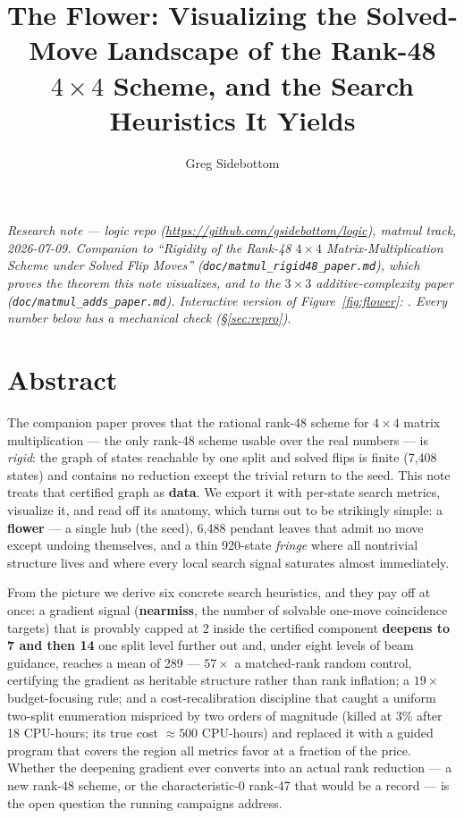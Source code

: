 \documentclass[10pt]{article}
\title{\bfseries The Flower: Visualizing the Solved-Move Landscape of
  the Rank-48 $4\times4$ Scheme, and the Search Heuristics It Yields}
\author{Greg Sidebottom}
\date{}
\begin{document}
\maketitle
\vspace{-3em}
\begin{center}
\itshape Research note --- logic repo
(\url{https://github.com/gsidebottom/logic}), matmul track,
2026-07-09. Companion to ``Rigidity of the Rank-48 $4\times4$
Matrix-Multiplication Scheme under Solved Flip Moves''
(\texttt{doc/matmul\_rigid48\_paper.md}), which proves the theorem
this note visualizes, and to the $3\times3$ additive-complexity paper
(\texttt{doc/matmul\_adds\_paper.md}). Interactive version of
Figure~\ref{fig:flower}:
.
Every number below has a mechanical check (\S\ref{sec:repro}).
\end{center}

\section*{Abstract}

The companion paper proves that the rational rank-48 scheme for
$4\times4$ matrix multiplication --- the only rank-48 scheme usable
over the real numbers --- is \emph{rigid}: the graph of states
reachable by one split and solved flips is finite (7{,}408 states) and
contains no reduction except the trivial return to the seed. This
note treats that certified graph as \textbf{data}. We export it with
per-state search metrics, visualize it, and read off its anatomy,
which turns out to be strikingly simple: a \textbf{flower} --- a
single hub (the seed), 6{,}488 pendant leaves that admit no move
except undoing themselves, and a thin 920-state \emph{fringe} where
all nontrivial structure lives and where every local search signal
saturates almost immediately.

From the picture we derive six concrete search heuristics, and they
pay off at once: a gradient signal (\textbf{nearmiss}, the number of
solvable one-move coincidence targets) that is provably capped at 2
inside the certified component \textbf{deepens to 7 and then 14} one
split level further out and, under eight levels of beam guidance,
reaches a mean of 289 --- $57\times$ a matched-rank random control,
certifying the gradient as heritable structure rather than rank
inflation; a $19\times$
budget-focusing rule; and a cost-recalibration discipline that caught
a uniform two-split enumeration mispriced by two orders of magnitude
(killed at 3\% after 18 CPU-hours; its true cost ${\approx}500$
CPU-hours) and replaced it with a guided program that covers the
region all metrics favor at a fraction of the price. Whether the
deepening gradient ever converts into an actual rank reduction --- a
new rank-48 scheme, or the characteristic-0 rank-47 that would be a
record --- is the open question the running campaigns address.
\end{document}
